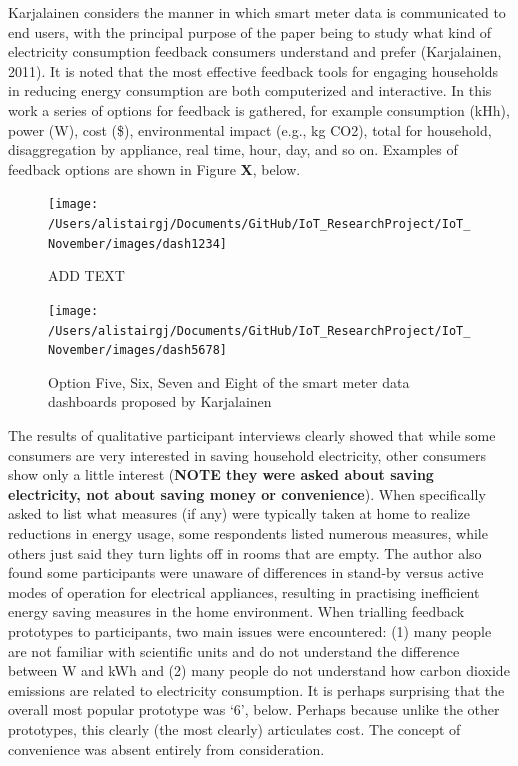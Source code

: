 \documentclass[11pt,]{article}
\begin{document}
Karjalainen considers the manner in which smart meter data is
communicated to end users, with the principal purpose of the paper being
to study what kind of electricity consumption feedback consumers
understand and prefer (Karjalainen, 2011). It is noted that the most
effective feedback tools for engaging households in reducing energy
consumption are both computerized and interactive. In this work a series
of options for feedback is gathered, for example consumption (kHh),
power (W), cost (\$), environmental impact (e.g., kg CO2), total for
household, disaggregation by appliance, real time, hour, day, and so on.
Examples of feedback options are shown in Figure \textbf{X}, below.

\begin{figure}[H]

{\centering \texttt{[image: /Users/alistairgj/Documents/GitHub/IoT\_ResearchProject/IoT\_November/images/dash1234]} 

}

\caption{ADD TEXT}\label{fig:unnamed-chunk-1}
\end{figure}

\begin{figure}[H]

{\centering \texttt{[image: /Users/alistairgj/Documents/GitHub/IoT\_ResearchProject/IoT\_November/images/dash5678]} 

}

\caption{Option Five, Six, Seven and Eight of the smart meter data dashboards proposed by Karjalainen}\label{fig:unnamed-chunk-2}
\end{figure}

The results of qualitative participant interviews clearly showed that
while some consumers are very interested in saving household
electricity, other consumers show only a little interest (\textbf{NOTE
they were asked about saving electricity, not about saving money or
convenience}). When specifically asked to list what measures (if any)
were typically taken at home to realize reductions in energy usage, some
respondents listed numerous measures, while others just said they turn
lights off in rooms that are empty. The author also found some
participants were unaware of differences in stand-by versus active modes
of operation for electrical appliances, resulting in practising
inefficient energy saving measures in the home environment. When
trialling feedback prototypes to participants, two main issues were
encountered: (1) many people are not familiar with scientific units and
do not understand the difference between W and kWh and (2) many people
do not understand how carbon dioxide emissions are related to
electricity consumption. It is perhaps surprising that the overall most
popular prototype was `6', below. Perhaps because unlike the other
prototypes, this clearly (the most clearly) articulates cost. The
concept of convenience was absent entirely from consideration.
\end{document}
